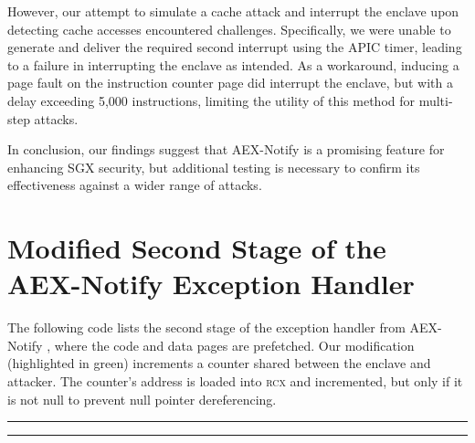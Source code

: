 \documentclass{llncs}
\begin{document}
However, our attempt to simulate a cache attack and interrupt the enclave upon
detecting cache accesses encountered challenges.
Specifically, we were unable to generate and deliver the required second
interrupt using the APIC timer, leading to a failure in interrupting the
enclave as intended.
As a workaround, inducing a page fault on the instruction counter page did
interrupt the enclave, but with a delay exceeding 5,000 instructions, limiting
the utility of this method for multi-step attacks.

In conclusion, our findings suggest that AEX-Notify is a promising feature for
enhancing SGX security, but additional testing is necessary to confirm its
effectiveness against a wider range of attacks.


%


\clearpage
\appendix

\section{Modified Second Stage of the AEX-Notify Exception Handler}
\label{apx:modification}

The following code lists the second stage of the exception handler from
AEX-Notify \cite{ConstableBCXXAK23}, where the code and data pages are
prefetched.
Our modification (highlighted in green) increments a counter shared between the
enclave and attacker.
The counter's address is loaded into \textsc{rcx} and incremented, but only if
it is not null to prevent null pointer dereferencing.

\noindent
\rule{0.8\textwidth}{0.4pt}
\vspace{-0.5em}
%
\vspace{-1.1em}
%
\vspace{-1.1em}

\vspace{-1em}
\rule{0.8\textwidth}{0.4pt}
\end{document}
